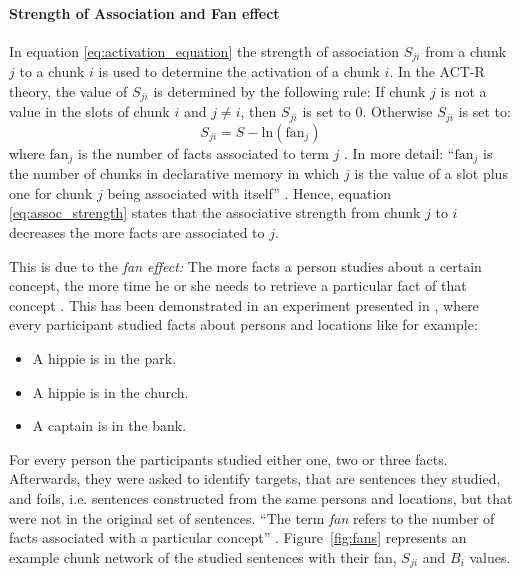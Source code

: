 \paragraph{Strength of Association and Fan effect}
\label{actr:fan_effect}

In equation \eqref{eq:activation_equation} the strength of association $S_{ji}$ from a chunk $j$ to a chunk $i$ is used to determine the activation of a chunk $i$.  In the ACT-R theory, the value of $S_{ji}$ is determined by the following rule: If chunk $j$ is not a value in the slots of chunk $i$ and $j \neq i$, then $S_{ji}$ is set to 0. Otherwise $S_{ji}$ is set to: 
\begin{equation}
\label{eq:assoc_strength}
S_{ji} = S - \mathrm{ln}(\mathrm{fan}_j)
\end{equation}
where $\mathrm{fan}_j$ is the number of facts associated to term $j$ \cite[1042]{anderson_implications_2000}. In more detail: ``$\mathrm{fan}_j$ is the number of chunks in declarative memory in which $j$ is the value of a slot plus one for chunk $j$ being associated with itself'' \cite[unit 5, p. 2]{actr_tutorial}. Hence, equation \eqref{eq:assoc_strength} states that the associative strength from chunk $j$ to $i$ decreases the more facts are associated to $j$.

This is due to the \emph{fan effect:} The more facts a person studies about a certain concept, the more time he or she needs to retrieve a particular fact of that concept \cite[186]{anderson_fan_1999}. This has been demonstrated in an experiment presented in \cite{anderson_fan_1999}, where every participant studied facts about persons and locations like for example:

\begin{itemize}
 \item A hippie is in the park.
 \item A hippie is in the church.
 \item A captain is in the bank.
\end{itemize}

For every person the participants studied either one, two or three facts. Afterwards, they were asked to identify targets, that are sentences they studied, and foils, i.e. sentences constructed from the same persons and locations, but that were not in the original set of sentences. ``The term \emph{fan} refers to the number of facts associated with a particular concept'' \cite[186]{anderson_fan_1999}. Figure~\ref{fig:fans} represents an example chunk network of the studied sentences with their fan, $S_{ji}$ and $B_i$ values.

